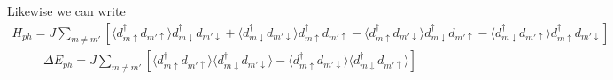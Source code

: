 \documentclass[11pt]{article}
\begin{document}
Likewise we can write
\begin{gather}
    H_{ph} = J\sum_{m\neq m'}\left[
        \langle d^\dagger_{m\uparrow} d_{m'\uparrow}\rangle d^\dagger_{m\downarrow} d_{m'\downarrow}
        +\langle d^\dagger_{m\downarrow} d_{m'\downarrow}\rangle d^\dagger_{m\uparrow}d_{m'\uparrow}
        - \langle d^\dagger_{m\uparrow} d_{m'\downarrow}\rangle d^\dagger_{m\downarrow}d_{m'\uparrow}
        - \langle d^\dagger_{m\downarrow} d_{m'\uparrow}\rangle d^\dagger_{m\uparrow} d_{m'\downarrow}
    \right]
\end{gather}
\begin{gather}
    \Delta E_{ph} = J \sum_{m\neq m'}\left[ \langle d^\dagger_{m\uparrow} d_{m'\uparrow} \rangle 
    \langle d^\dagger_{m\downarrow} d_{m'\downarrow} \rangle
    - \langle d^\dagger_{m\uparrow} d_{m' \downarrow} \rangle
    \langle d^\dagger_{m\downarrow}d_{m'\uparrow}\rangle \right]
\end{gather}
\end{document}
